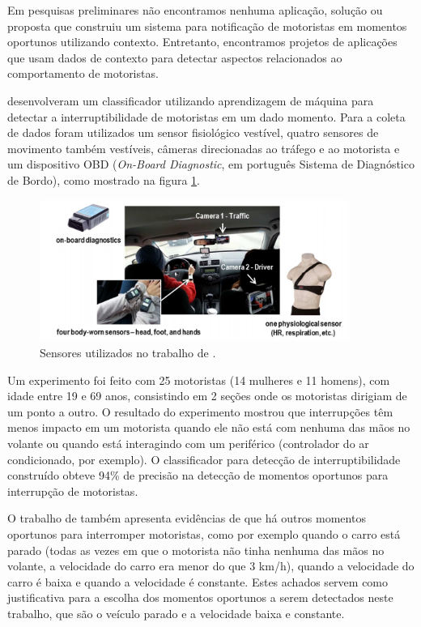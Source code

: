 Em pesquisas preliminares não encontramos nenhuma aplicação, solução ou proposta que construiu um sistema para
notificação de motoristas em momentos oportunos utilizando contexto. Entretanto, encontramos projetos de aplicações que
usam dados de contexto para detectar aspectos relacionados ao comportamento de motoristas.

 desenvolveram um classificador utilizando aprendizagem de máquina para detectar a interruptibilidade
de motoristas em um dado momento. Para a coleta de dados foram utilizados um sensor fisiológico vestível, quatro sensores
de movimento também vestíveis, câmeras direcionadas ao tráfego e ao motorista e um dispositivo OBD (\textit{On-Board Diagnostic},
em português Sistema de Diagnóstico de Bordo), como mostrado na figura \ref{kim-sensors}.

\begin{figure}[h]
\centering
\includegraphics[width=0.9\textwidth]{images/kim-sensors.png}
\caption{Sensores utilizados no trabalho de .}
\label{kim-sensors}
\end{figure}

Um experimento foi feito com 25 motoristas (14 mulheres e 11 homens), com idade entre 19 e 69 anos, consistindo em 2 seções
onde os motoristas dirigiam de um ponto a outro. O resultado do experimento mostrou que interrupções têm menos impacto em um motorista
quando ele não está com nenhuma das mãos no volante ou quando está interagindo com um periférico (controlador do ar condicionado, por exemplo).
O classificador para detecção de interruptibilidade construído obteve 94\% de precisão na detecção de momentos
oportunos para interrupção de motoristas.

O trabalho de  também apresenta evidências de que há outros momentos oportunos para interromper motoristas, como
por exemplo quando o carro está parado (todas as vezes em que o motorista não tinha nenhuma das mãos no volante, a velocidade do carro era menor
do que 3 km/h), quando a velocidade do carro é baixa e quando a velocidade é constante. Estes achados servem como justificativa para a
escolha dos momentos oportunos a serem detectados neste trabalho, que são o veículo parado e a velocidade baixa e constante.

